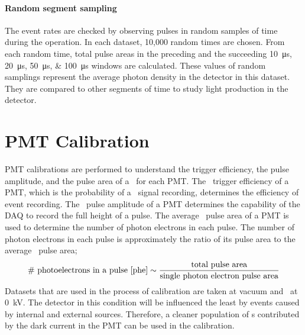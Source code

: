 \paragraph{Random segment sampling}
The event rates are checked by observing pulses in random samples of time during the operation. In each dataset, 10,000 random times are chosen. From each random time, total pulse areas in the preceding and the succeeding \SIlist{10;20;50;100}{\us} windows are calculated. These values of random samplings represent the average photon density in the detector in this dataset. They are compared to other segments of time to study light production in the detector.  

\section{PMT Calibration}
\label{sec:pmt cal} 
PMT calibrations are performed to understand the trigger efficiency, the pulse amplitude, and the pulse area of a \sphe\ for each PMT. The \sphe\ trigger efficiency of a PMT, which is the probability of a \sphe\ signal recording, determines the efficiency of event recording. The \sphe\ pulse amplitude of a PMT determines the capability of the DAQ to record the full height of a pulse. The average \sphe\ pulse area of a PMT is used to determine the number of photon electrons in each pulse. The number of photon electrons in each pulse is approximately the ratio of its pulse area to the average \sphe\ pulse area; 
\begin{align}
  	\text{\#\  photoelectrons in a pulse [\si{phe}]} \sim \frac{\text{total pulse area}}{\text{single photon electron pulse area}}
\end{align}     
Datasets that are used in the process of calibration are taken at vacuum and \opvtvb\ at \SI{0}{\kV}. The detector in this condition will be influenced the least by events caused by internal and external sources. Therefore, a cleaner population of \sphe s contributed by the dark current in the PMT can be used in the calibration. 
  
  
